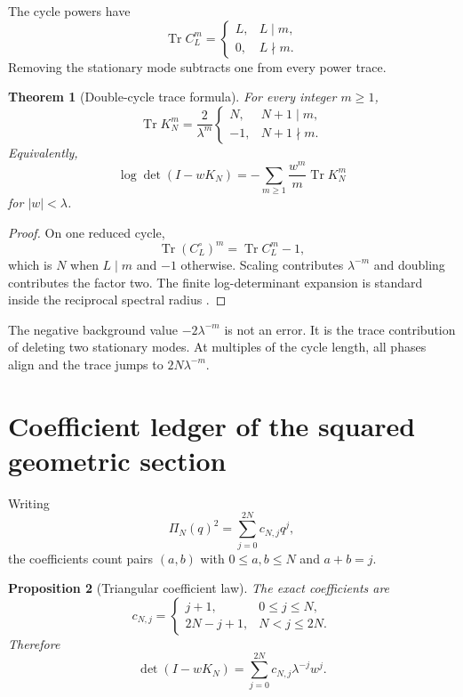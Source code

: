 \documentclass[12pt]{article}
\newtheorem{theorem}{Theorem}[section]
\newtheorem{proposition}[theorem]{Proposition}
\theoremstyle{remark}
\newcommand{\Tr}{\operatorname{Tr}}
\begin{document}
The cycle powers have
\[
 \Tr C_L^m=
 \begin{cases}
 L,&L\mid m,\\
 0,&L\nmid m.
 \end{cases}
\]
Removing the stationary mode subtracts one from every power trace.

\begin{theorem}[Double-cycle trace formula]\label{thm:trace}
For every integer $m\ge1$,
\begin{equation}\label{eq:trace}
 \Tr K_N^m=
 \frac{2}{\lambda^m}
 \begin{cases}
 N,&N+1\mid m,\\
 -1,&N+1\nmid m.
 \end{cases}
\end{equation}
Equivalently,
\begin{equation}\label{eq:logdet}
 \log\det(I-wK_N)
 =-\sum_{m\ge1}\frac{w^m}{m}\Tr K_N^m
\end{equation}
for $|w|<\lambda$.
\end{theorem}

\begin{proof}
On one reduced cycle,
\[
 \Tr(C_L^\circ)^m=\Tr C_L^m-1,
\]
which is $N$ when $L\mid m$ and $-1$ otherwise.  Scaling contributes
$\lambda^{-m}$ and doubling contributes the factor two.  The finite
log-determinant expansion is standard inside the reciprocal spectral radius
\citep{Simon2005}.
\end{proof}

The negative background value $-2\lambda^{-m}$ is not an error.  It is the
trace contribution of deleting two stationary modes.  At multiples of the
cycle length, all phases align and the trace jumps to
$2N\lambda^{-m}$.

\section{Coefficient ledger of the squared geometric section}

Writing
\begin{equation}\label{eq:coefficients}
 \Pi_N(q)^2=\sum_{j=0}^{2N}c_{N,j}q^j,
\end{equation}
the coefficients count pairs $(a,b)$ with
$0\le a,b\le N$ and $a+b=j$.

\begin{proposition}[Triangular coefficient law]\label{prop:coefficients}
The exact coefficients are
\begin{equation}\label{eq:triangular}
 c_{N,j}=
 \begin{cases}
 j+1,&0\le j\le N,\\
 2N-j+1,&N<j\le2N.
 \end{cases}
\end{equation}
Therefore
\begin{equation}\label{eq:scaled-coefficients}
 \det(I-wK_N)
 =\sum_{j=0}^{2N}c_{N,j}\lambda^{-j}w^j.
\end{equation}
\end{proposition}
\end{document}
